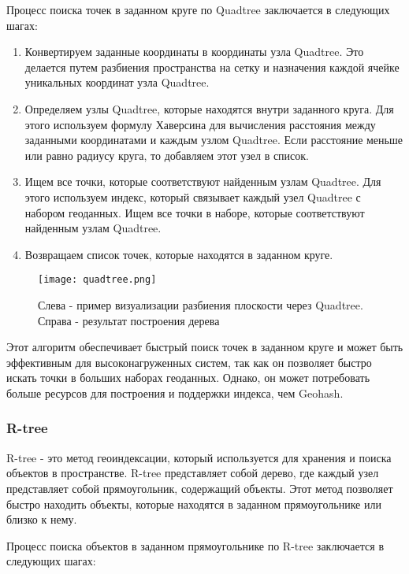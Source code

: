 Процесс поиска точек в заданном круге по Quadtree заключается в следующих шагах:
\begin{enumerate}
    \item Конвертируем заданные координаты в координаты узла Quadtree. Это делается путем разбиения пространства на сетку и назначения каждой ячейке уникальных координат узла Quadtree.
    \item Определяем узлы Quadtree, которые находятся внутри заданного круга. Для этого используем формулу Хаверсина для вычисления расстояния между заданными координатами и каждым узлом Quadtree. Если расстояние меньше или равно радиусу круга, то добавляем этот узел в список.
    \item Ищем все точки, которые соответствуют найденным узлам Quadtree. Для этого используем индекс, который связывает каждый узел Quadtree с набором геоданных. Ищем все точки в наборе, которые соответствуют найденным узлам Quadtree.
    \item Возвращаем список точек, которые находятся в заданном круге.
\end{enumerate}

\begin{figure}[h]
    \centering
    \texttt{[image: quadtree.png]}
    \caption{Слева - пример визуализации разбиения плоскости через Quadtree. Справа - результат построения дерева}
\end{figure}

Этот алгоритм обеспечивает быстрый поиск точек в заданном круге и может быть эффективным для высоконагруженных систем, так как он позволяет быстро искать точки в больших наборах геоданных. Однако, он может потребовать больше ресурсов для построения и поддержки индекса, чем Geohash.

\subsubsection{R-tree}
R-tree - это метод геоиндексации, который используется для хранения и поиска объектов в пространстве. R-tree представляет собой дерево, где каждый узел представляет собой прямоугольник, содержащий объекты. Этот метод позволяет быстро находить объекты, которые находятся в заданном прямоугольнике или близко к нему.

Процесс поиска объектов в заданном прямоугольнике по R-tree заключается в следующих шагах:

